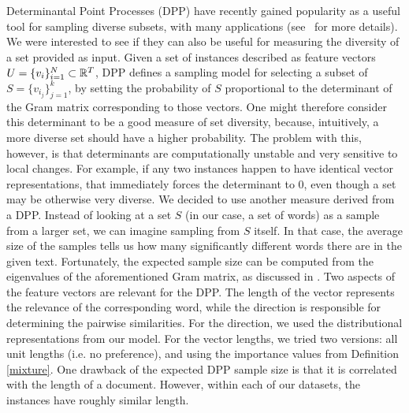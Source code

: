 Determinantal Point Processes (DPP) have recently gained popularity as a
useful tool for sampling diverse subsets, with many applications
(see~\cite{kulesza:2012} for more details). We were interested to see
if they can also be useful for 
measuring the diversity of a set provided as input. Given a set of
instances described as feature vectors $U=\{v_i\}_{i=1}^N\subset {\mathbb R}^T$, DPP defines a
sampling model for selecting a subset of $S=\{v_{i_j}\}_{j=1}^k$, by
setting the probability of $S$ proportional to the determinant of the
Gram matrix corresponding to those vectors. One might therefore
consider this determinant to be a good measure of set diversity,
because, intuitively, a more diverse set should have a higher
probability. The problem with this, however, is that determinants are
computationally unstable and very sensitive to local changes. For
example, if any two instances happen to have identical vector
representations, that immediately forces the determinant to $0$, even
though a set may be otherwise very diverse. We decided to use
another measure derived from a DPP. Instead of looking at a set $S$
(in our case, a set of words) as a sample from a larger set, we can
imagine sampling from $S$ itself. In that case, the average size of
the samples tells us how many significantly different words there are
in the given text. Fortunately, the expected sample size can be
computed from the eigenvalues of the aforementioned Gram matrix, as
discussed in \cite{kulesza:2012}. Two aspects of the feature
vectors are relevant for the DPP. The length of the vector represents
the relevance of the corresponding word, while the direction is
responsible for determining the pairwise similarities. For the
direction, we used the distributional representations from 
our model. For the vector lengths, we tried two versions: all
unit lengths (i.e. no preference), and using the importance values from
Definition \ref{mixture}. One drawback of the expected
DPP sample size is that it is correlated with the length of a
document. However, within each of our datasets, the instances have roughly
similar length.

